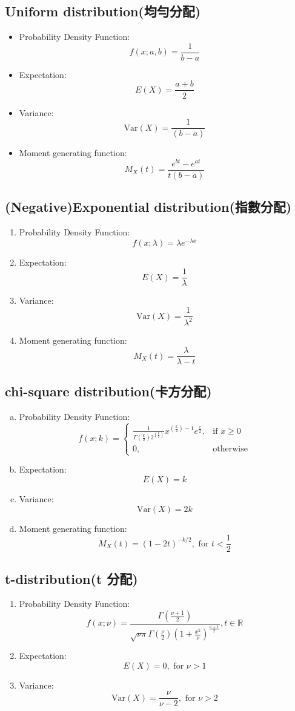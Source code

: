 \documentclass[12pt, a4paper]{article}
\begin{document}
\subsection{Uniform distribution(均勻分配)}
\begin{itemize}
\item Probability Density Function:$$f(x;a,b)=\frac {1}{b-a}$$
\item Expectation:$$E(X) = \frac{a + b}{2}$$
\item Variance:$$\text{Var}(X) = \frac{1}{(b-a)}$$
\item Moment generating function:$$M_X(t) = \frac{e^{bt} - e^{at}}{t(b - a)}$$
\end{itemize}
\subsection{(Negative)Exponential distribution(指數分配)}
\begin{enumerate}[1.]
\item Probability Density Function:$$f(x;\lambda)=\lambda e^{-\lambda x}$$
\item Expectation:$$E(X) = \frac{1}{\lambda}$$
\item Variance:$$\text{Var}(X) = \frac{1}{\lambda^2}$$
\item Moment generating function:$$M_X(t) =\frac{\lambda}{\lambda - t}$$
\end{enumerate}
\subsection{chi-square distribution(卡方分配)}
\begin{enumerate}[a.]
\item Probability Density Function:$$f(x; k) = 
\begin{cases}
    \frac{1}{\Gamma(\frac{k}{2})2^{(\frac{k}{2})} } x^{(\frac{k}{2})-1} e^{\frac{x}{2}}, & \text{if } x \geq 0 \\
    0, & \text{otherwise}
\end{cases}$$
\item Expectation:$$E(X) = k$$
\item Variance:$$\text{Var}(X) = 2k$$
\item Moment generating function:$$M_X(t) = (1 - 2t)^{-k/2}, \text{ for } t < \frac{1}{2}$$
\end{enumerate}
\subsection{t-distribution(t 分配)}
\begin{enumerate}[$\bullet$]
\item Probability Density Function:$$f(x; \nu) = \frac{\Gamma\left(\frac{\nu+1}{2}\right)}{\sqrt{\nu\pi} \Gamma\left(\frac{\nu}{2}\right) \left(1+\frac{x^2}{\nu}\right)^{\frac{\nu+1}{2}}},t \in \mathbb{R}$$
\item Expectation:$$E(X) = 0, \text{ for } \nu > 1$$
\item Variance:$$\text{Var}(X) = \frac{\nu}{\nu-2}, \text{ for } \nu > 2$$
\end{enumerate}
\end{document}
